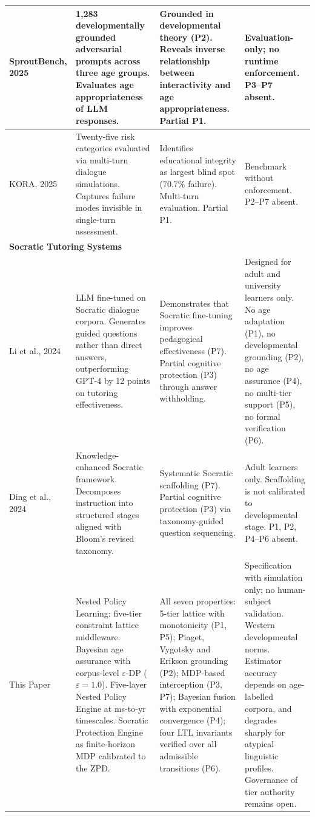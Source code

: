 \documentclass[fleqn,10pt]{wlscirep}
\begin{document}
\begin{table}[htbp]
\begin{tabular}{p{2cm}p{4cm}p{3.5cm}p{4.5cm}}
\hline
SproutBench, 2025 & 1,283 developmentally grounded adversarial prompts across three age groups. Evaluates age appropriateness of LLM responses. & Grounded in developmental theory (P2). Reveals inverse relationship between interactivity and age appropriateness. Partial P1. & Evaluation-only; no runtime enforcement. P3--P7 absent. \\
\hline
KORA, 2025 & Twenty-five risk categories evaluated via multi-turn dialogue simulations. Captures failure modes invisible in single-turn assessment. & Identifies educational integrity as largest blind spot (70.7\% failure). Multi-turn evaluation. Partial P1. & Benchmark without enforcement. P2--P7 absent. \\
\hline
\multicolumn{4}{l}{\textbf{Socratic Tutoring Systems}} \\
\hline
Li et al., 2024 & LLM fine-tuned on Socratic dialogue corpora. Generates guided questions rather than direct answers, outperforming GPT-4 by 12 points on tutoring effectiveness. & Demonstrates that Socratic fine-tuning improves pedagogical effectiveness (P7). Partial cognitive protection (P3) through answer withholding. & Designed for adult and university learners only. No age adaptation (P1), no developmental grounding (P2), no age assurance (P4), no multi-tier support (P5), no formal verification (P6). \\
\hline
Ding et al., 2024 & Knowledge-enhanced Socratic framework. Decomposes instruction into structured stages aligned with Bloom's revised taxonomy. & Systematic Socratic scaffolding (P7). Partial cognitive protection (P3) via taxonomy-guided question sequencing. & Adult learners only. Scaffolding is not calibrated to developmental stage. P1, P2, P4--P6 absent. \\
\hline
This Paper & Nested Policy Learning: five-tier constraint lattice middleware. Bayesian age assurance with corpus-level $\varepsilon$-DP ($\varepsilon = 1.0$). Five-layer Nested Policy Engine at ms-to-yr timescales. Socratic Protection Engine as finite-horizon MDP calibrated to the ZPD. & All seven properties: 5-tier lattice with monotonicity (P1, P5); Piaget, Vygotsky and Erikson grounding (P2); MDP-based interception (P3, P7); Bayesian fusion with exponential convergence (P4); four LTL invariants verified over all admissible transitions (P6). & Specification with simulation only; no human-subject validation. Western developmental norms. Estimator accuracy depends on age-labelled corpora, and degrades sharply for atypical linguistic profiles. Governance of tier authority remains open. \\
\hline
\end{tabular}
\end{table}
\end{document}
